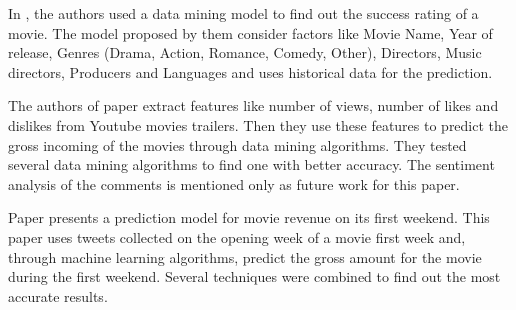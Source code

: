 In \cite{2017MoviePredictionData}, the authors used a data mining model to find out the success rating of a movie. The model proposed by them consider factors like Movie Name, Year of release, Genres (Drama, Action, Romance, Comedy, Other), Directors, Music directors, Producers and Languages and uses historical data for the prediction.

The authors of paper \cite{2017MiningYouTubeTrailers} extract features like number of views, number of likes and dislikes from Youtube movies trailers. Then they use these features to predict the gross incoming of the movies through data mining algorithms. They tested several data mining algorithms to find one with better accuracy. The sentiment analysis of the comments is mentioned only as future work for this paper.

Paper \cite{2017PredictingMarketRevenue} presents a prediction model for movie revenue on its first weekend. This paper uses tweets collected on the opening week of a movie first week and, through machine learning algorithms, predict the gross amount for the movie during the first weekend. Several techniques were combined to find out the most accurate results.